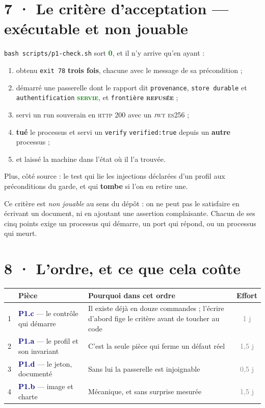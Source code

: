 \documentclass[10pt]{article}
\newcommand{\best}[1]{\textcolor{green}{\textbf{#1}}}
\newcommand{\moyen}[1]{\textcolor{amber}{\textbf{#1}}}
\newcommand{\sz}[1]{\textcolor{grey}{\small\textsf{#1}}}
\newcommand{\code}[1]{\texttt{\small #1}}
\newcommand{\mm}[1]{\textbf{\textcolor{navy}{#1}}}
\begin{document}
\section{7 · Le critère d'acceptation --- exécutable et non jouable}

\begin{acquis}
\code{bash scripts/p1-check.sh} sort \best{0}, et il n'y arrive qu'en ayant :

\begin{enumerate}[leftmargin=1.5em,itemsep=1pt,topsep=2pt]
\item obtenu \code{exit 78} \textbf{trois fois}, chacune avec le message de sa précondition ;
\item démarré une passerelle dont le rapport dit \code{provenance}, \code{store durable} et
      \code{authentification} \best{\textsc{servie}}, et \code{frontière} \moyen{\textsc{refusée}} ;
\item servi un run souverain en \textsc{http} 200 avec un \textsc{jwt} \textsc{es}256 ;
\item \textbf{tué} le processus et servi un \code{verify} \code{verified:true} depuis un
      \textbf{autre} processus ;
\item et laissé la machine dans l'état où il l'a trouvée.
\end{enumerate}

Plus, côté source : le test qui lie les injections déclarées d'un profil aux préconditions du
garde, et qui \textbf{tombe} si l'on en retire une.
\end{acquis}

Ce critère est \emph{non jouable} au sens du dépôt : on ne peut pas le satisfaire en écrivant un
document, ni en ajoutant une assertion complaisante. Chacun de ses cinq points exige un processus
qui démarre, un port qui répond, ou un processus qui meurt.

\section{8 · L'ordre, et ce que cela coûte}

\begin{center}\small
\renewcommand{\arraystretch}{1.26}
\begin{tabular}{@{}c >{\raggedright\arraybackslash}p{8.4cm} >{\raggedright\arraybackslash}p{4.4cm} c@{}}
\toprule
& \textbf{Pièce} & \textbf{Pourquoi dans cet ordre} & \textbf{Effort} \\
\midrule
1 & \mm{P1.c} --- le contrôle qui démarre & Il existe déjà en douze commandes ; l'écrire d'abord fige le critère avant de toucher au code & \sz{1 j} \\
2 & \mm{P1.a} --- le profil et son invariant & C'est la seule pièce qui ferme un défaut réel & \sz{1,5 j} \\
3 & \mm{P1.d} --- le jeton, documenté & Sans lui la passerelle est injoignable & \sz{0,5 j} \\
4 & \mm{P1.b} --- image et charte & Mécanique, et sans surprise mesurée & \sz{1,5 j} \\
\bottomrule
\end{tabular}
\end{center}
\end{document}

